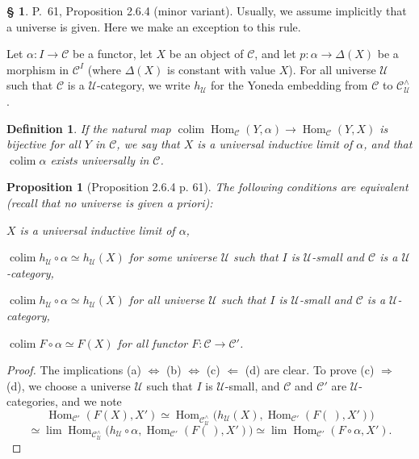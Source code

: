 \documentclass[12pt]{article}%
\newtheorem{prop}[thm]{Proposition}
\newtheorem{df}[thm]{Definition}%
\theoremstyle{remark}
\theoremstyle{definition}
\newtheorem{s}[thm]{\S}%
\newcommand{\nn}{\noindent}
\newcommand{\C}{\mathcal C}
\newcommand{\U}{\mathcal U}
\newcommand{\si}{\Leftarrow}
\newcommand{\ssi}{\Leftrightarrow}%
\newcommand{\then}{\Rightarrow}
\DeclareMathOperator*{\colim}{colim}
\DeclareMathOperator{\Hom}{Hom}%
\begin{document}
\begin{s} 
P.~61, Proposition 2.6.4 (minor variant). Usually, we assume implicitly that a universe is given. Here we make an exception to this rule. 

Let $\alpha:I\to\C$ be a functor, let $X$ be an object of $\C$, and let $p:\alpha\to\Delta(X)$ be a morphism in $\C^I$ (where $\Delta(X)$ is constant with value $X$). For all universe $\U$ such that $\C$ is a $\U$-category, we write $h_\U$ for the Yoneda embedding from $\C$ to $\C^\wedge_\U$.

\begin{df}\label{uil}
If the natural map $\colim\Hom_\C(Y,\alpha)\to\Hom_\C(Y,X)$ is bijective for all $Y$ in $\C$, we say that $X$ is a {\em universal} inductive limit  of $\alpha$, and that $\colim\alpha$ exists {\em universally}  in $\C$.
\end{df}

\begin{prop}[Proposition 2.6.4 p. 61]%
The following conditions are equivalent (recall that no universe is given {\em a priori}):

\nn{\em(a)} $X$ is a universal inductive limit of $\alpha$,

\nn{\em(b)} $\colim h_\U\circ\alpha\simeq h_\U(X)$ for some universe $\U$ such that $I$ is $\U$-small and $\C$ is a $\U$-category,

\nn{\em(c)} $\colim h_\U\circ\alpha\simeq h_\U(X)$ for all universe $\U$ such that $I$ is $\U$-small and $\C$ is a $\U$-category, 

\nn{\em(d)} $\colim F\circ\alpha\simeq F(X)$ for all functor $F:\C\to\C'$. 
\end{prop}

\begin{proof} The implications (a) $\ssi$ (b) $\ssi$ (c) $\si$ (d) are clear. To prove (c) $\then$ (d), we choose a universe $\U$ such that $I$ is $\U$-small, and $\C$ and $\C'$ are $\U$-categories, and we note
$$
\Hom_{\C'}(F(X),X')\simeq\Hom_{\C^\wedge_\U}\big(h_\U(X),\Hom_{\C'}(F(\ ),X')\big)
$$
$$
\simeq\lim\Hom_{\C^\wedge_\U}\big(h_\U\circ\alpha,\Hom_{\C'}(F(\ ),X')\big)\simeq\lim\Hom_{\C'}(F\circ\alpha,X').
$$
\end{proof}
\end{s}

%
\end{document}
